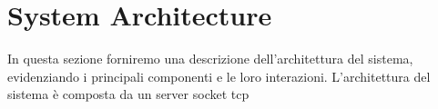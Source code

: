 \section{System Architecture}
In questa sezione forniremo una descrizione dell'architettura del sistema, evidenziando i principali componenti e le loro interazioni.
L'architettura del sistema è composta da un server socket tcp 
